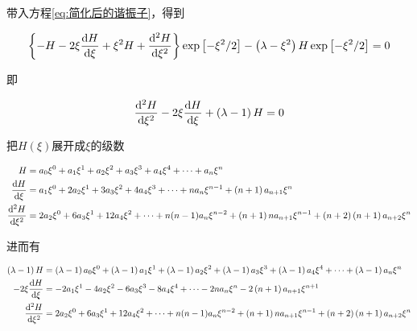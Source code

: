 带入方程\ref{eq:简化后的谐振子}，得到

\begin{equation*}
  \begin{aligned}
    \left\{ - H - 2 \xi \dfrac{\mathop{}\!\mathrm{d} H}{\mathop{}\!\mathrm{d} \xi} + \xi^2 H + \dfrac{\mathop{}\!\mathrm{d}^2 H}{\mathop{}\!\mathrm{d} \xi^2}   \right\} \exp \left[ - \xi^2 / 2 \right] - \left( \lambda - \xi^2 \right) H \exp \left[ - \xi^2 / 2 \right] = 0
  \end{aligned}
\end{equation*}

即

\begin{equation}
  \label{eq:谐振子方程最终形式}
  \begin{aligned}
    \dfrac{\mathop{}\!\mathrm{d}^2 H}{\mathop{}\!\mathrm{d} \xi^2} - 2 \xi \dfrac{\mathop{}\!\mathrm{d} H}{\mathop{}\!\mathrm{d} \xi} + \left( \lambda - 1 \right)H = 0  
  \end{aligned}
\end{equation}

把$H \left( \xi \right)$展开成$\xi$的级数

\begin{equation*}
  \begin{aligned}
    H &= a_0 \xi^0 + a_1 \xi^1 + a_2 \xi^2 + a_3 \xi^3 + a_4 \xi^4 + \dots + a_n \xi^n \\
    \dfrac{\mathop{}\!\mathrm{d} H}{\mathop{}\!\mathrm{d} \xi} &= a_1 \xi^0 + 2a_2 \xi^1 + 3a_3 \xi^2 + 4a_4 \xi^3 + \dots + na_n \xi^{n-1} + \left( n + 1 \right) a_{n+1} \xi^n \\
    \dfrac{\mathop{}\!\mathrm{d}^2 H}{\mathop{}\!\mathrm{d} \xi^2} &= 2a_2 \xi^0 + 6a_3 \xi^1 + 12a_4 \xi^2  + \dots + n(n-1)a_n \xi^{n-2} + \left( n + 1 \right) n a_{n+1} \xi^{n-1} + \left( n + 2 \right) \left( n + 1 \right) a_{n+2} \xi^n \\
  \end{aligned}
\end{equation*}

进而有

\begin{equation*}
  \begin{aligned}
    \left( \lambda - 1 \right) H &=\left( \lambda - 1 \right) a_0 \xi^0 +\left( \lambda - 1 \right) a_1 \xi^1 +\left( \lambda - 1 \right) a_2 \xi^2 +\left( \lambda - 1 \right) a_3 \xi^3 +\left( \lambda - 1 \right) a_4 \xi^4 + \dots +\left( \lambda - 1 \right) a_n \xi^n \\
    - 2 \xi \dfrac{\mathop{}\!\mathrm{d} H}{\mathop{}\!\mathrm{d} \xi} &= - 2 a_1 \xi^1 - 4 a_2 \xi^2 - 6a_3 \xi^3 - 8 a_4 \xi^4 + \dots - 2n a_n \xi^{n} - 2 \left( n + 1 \right) a_{n+1} \xi^{n+1} \\
    \dfrac{\mathop{}\!\mathrm{d}^2 H}{\mathop{}\!\mathrm{d} \xi^2} &= 2a_2 \xi^0 + 6a_3 \xi^1 + 12a_4 \xi^2  + \dots + n(n-1)a_n \xi^{n-2} + \left( n + 1 \right) n a_{n+1} \xi^{n-1} + \left( n + 2 \right) \left( n + 1 \right) a_{n+2} \xi^n \\
  \end{aligned}
\end{equation*}

